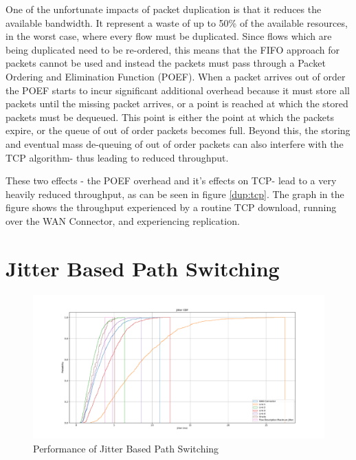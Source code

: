 One of the unfortunate impacts of packet duplication is that it reduces the available bandwidth. It represent a waste of up to 50\% of the available resources, in the worst case, where every flow must be duplicated. Since flows which are being duplicated need to be re-ordered, this means that the FIFO approach for packets cannot be used and instead the packets must pass through a Packet Ordering and Elimination Function (POEF). When a packet arrives out of order the POEF starts to incur significant additional overhead because it must store all packets until the missing packet arrives, or a point is reached at which the stored packets must be dequeued. This point is either the point at which the packets expire, or the queue of out of order packets becomes full. Beyond this, the storing and eventual mass de-queuing of out of order packets can also interfere with the TCP algorithm- thus leading to reduced throughput.

These two effects - the POEF overhead and it's effects on TCP- lead to a very heavily reduced throughput, as can be seen in figure \ref{dup:tcp}. The graph in the figure shows the throughput experienced by a routine TCP download, running over the WAN Connector, and experiencing replication. 

\section{Jitter Based Path Switching}

\begin{figure}[h]
    \centering
        \includegraphics[height=0.66\textwidth,width=\textwidth]{fig/jitter_cdf.pdf}
        \caption{Performance of Jitter Based Path Switching}
        \label{fig:jitter_cdf}
\end{figure}

